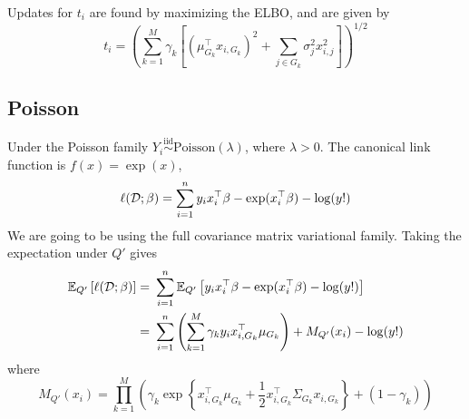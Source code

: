 \documentclass[12pt]{article}
\begin{document}
Updates for $t_i$ are found by maximizing the ELBO, and are given by
\begin{equation}
    t_i = \left( 
	\sum_{k=1}^M \gamma_k \left[
	    (\mu_{G_k}^\top x_{i, G_k})^2 + \sum_{j \in G_k} \sigma_{j}^2 x_{i, j}^2
	\right]
    \right)^{1/2}
\end{equation}


\newpage
\subsection*{Poisson}

Under the Poisson family $Y_i \overset{\text{iid}}{\sim} \text{Poisson} (\lambda)$, where $\lambda > 0$. The canonical link function is $f(x) = \exp(x)$, 
\begin{equation}
    \ell(\mathcal{D}; \beta) = \sum_{i=1}^n y_i x_i^\top \beta - \exp(x_i^\top \beta) - \log(y!)
\end{equation}
We are going to be using the full covariance matrix variational family. Taking the expectation under $Q'$ gives
\begin{align}
    \mathbb{E}_{Q'} \left[ \ell (\mathcal{D}; \beta) \right] 
    =&\ \sum_{i=1}^n \mathbb{E}_{Q'} \left[ 
	y_i x_i^\top \beta - \exp(x_i^\top \beta) - \log(y!)
    \right]
    \nonumber
    \\
    =&\
    \sum_{i=1}^n 
    \left( \sum_{k=1}^M \gamma_k y_i x_{i, G_k}^\top \mu_{G_k} \right)
    +
    M_{Q'}(x_i)
    - 
    \log(y!)
\end{align}
where
\begin{equation}
M_{Q'}(x_i)
    =	
    \prod_{k=1}^M \left(
	\gamma_k \exp \left\{ 
	    x_{i, G_k}^\top \mu_{G_k} + 
	    \frac{1}{2} x_{i, G_k}^\top \Sigma_{G_k} x_{i, G_k}
	\right\}
	+ 
	(1- \gamma_k) 
    \right)
\end{equation}



\end{document}

